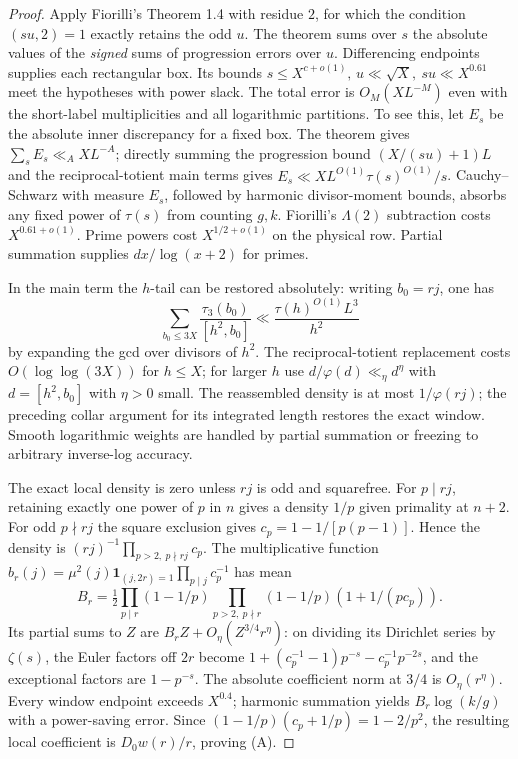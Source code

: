 \documentclass[11pt]{article}
\begin{document}
\begin{proof}
Apply Fiorilli's Theorem 1.4 with residue \(2\), for which the condition
\((su,2)=1\) exactly retains the odd \(u\). The theorem sums over \(s\)
the absolute values of the \emph{signed} sums of progression errors over
\(u\). Differencing endpoints supplies each rectangular box. Its bounds
\(s\le X^{c+o(1)},\,u\ll\sqrt X,\ su\ll X^{0.61}\) meet the hypotheses
with power slack. The total error is \(O_M(XL^{-M})\) even with the
short-label multiplicities and all logarithmic partitions. To see this,
let \(E_s\) be the absolute inner discrepancy for a fixed box. The theorem
gives \(\sum_s E_s\ll_A XL^{-A}\); directly summing the progression
bound \((X/(su)+1)L\) and the reciprocal-totient main terms gives
\(E_s\ll XL^{O(1)}\tau(s)^{O(1)}/s\).
Cauchy--Schwarz with measure \(E_s\), followed by harmonic divisor-moment
bounds, absorbs any fixed power of \(\tau(s)\) from counting \(g,k\).
Fiorilli's \(\Lambda(2)\) subtraction costs \(X^{0.61+o(1)}\).
Prime powers cost \(X^{1/2+o(1)}\) on the physical row. Partial summation
supplies \(dx/\log(x+2)\) for primes.

In the main term the \(h\)-tail can be restored absolutely: writing
\(b_0=rj\), one has
\[\sum_{b_0\le3X}\frac{\tau_3(b_0)}{[h^2,b_0]}\ll \frac{\tau(h)^{O(1)}L^3}{h^2}\]
by expanding the gcd over divisors of \(h^2\).
The reciprocal-totient replacement costs \(O(\log\log(3X))\) for \(h\le X\);
for larger \(h\) use \(d/\varphi(d)\ll_\eta d^\eta\) with \(d=[h^2,b_0]\)
with \(\eta>0\) small. The reassembled density is at most \(1/\varphi(rj)\);
the preceding collar argument for its integrated length restores the exact
window. Smooth logarithmic weights are handled by partial summation or
freezing to arbitrary inverse-log accuracy.

The exact local density is zero unless \(rj\) is odd and squarefree.
For \(p\mid rj\), retaining exactly one power of \(p\) in \(n\) gives
a density \(1/p\) given primality at \(n+2\). For odd \(p\nmid rj\) the
square exclusion gives \(c_p=1-1/[p(p-1)]\). Hence the density is
\((rj)^{-1}\prod_{p>2,\ p\nmid rj}c_p\).
The multiplicative function
\(b_r(j)=\mu^2(j)\mathbf1_{(j,2r)=1}\prod_{p\mid j}c_p^{-1}\)
has mean
\[
 B_r=\tfrac12\prod_{p\mid r}(1-1/p)
               \prod_{p>2,\ p\nmid r}(1-1/p)(1+1/(pc_p)).
\]
Its partial sums to \(Z\) are \(B_rZ+O_\eta(Z^{3/4}r^\eta)\):
on dividing its Dirichlet series by \(\zeta(s)\), the Euler factors off
\(2r\) become \(1+(c_p^{-1}-1)p^{-s}-c_p^{-1}p^{-2s}\), and the
exceptional factors are \(1-p^{-s}\). The absolute coefficient norm at
\(3/4\) is \(O_\eta(r^\eta)\). Every window endpoint exceeds \(X^{0.4}\);
harmonic summation yields \(B_r\log(k/g)\) with a power-saving error.
Since \((1-1/p)(c_p+1/p)=1-2/p^2\), the resulting local coefficient is
\(D_0w(r)/r\), proving (A).


\end{proof}
\end{document}
